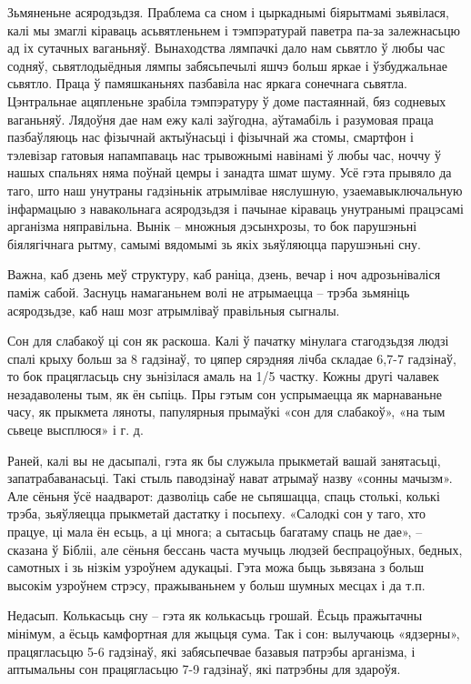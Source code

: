 Зьмяненьне асяродзьдзя. Праблема са сном і цыркаднымі біярытмамі зьявілася, калі мы змаглі кіраваць асьвятленьнем і тэмпэратурай паветра па-за залежнасьцю ад іх сутачных ваганьняў. Вынаходства лямпачкі дало нам сьвятло ў любы час содняў, сьвятлодыёдныя лямпы забясьпечылі яшчэ больш яркае і ўзбуджальнае сьвятло. Праца ў памяшканьнях пазбавіла нас яркага сонечнага сьвятла. Цэнтральнае ацяпленьне зрабіла тэмпэратуру ў доме пастаяннай, бяз содневых ваганьняў. Лядоўня дае нам ежу калі заўгодна, аўтамабіль і разумовая праца пазбаўляюць нас фізычнай актыўнасьці і фізычнай жа стомы, смартфон і тэлевізар гатовыя напампаваць нас трывожнымі навінамі ў любы час, ноччу ў нашых спальнях няма поўнай цемры і занадта шмат шуму. Усё гэта прывяло да таго, што наш унутраны гадзіньнік атрымлівае няслушную, узаемавыключальную інфармацыю з навакольнага асяродзьдзя і пачынае кіраваць унутранымі працэсамі арганізма няправільна. Вынік – множныя дэсынхрозы, то бок парушэньні біялягічнага рытму, самымі вядомымі зь якіх зьяўляюцца парушэньні сну.

Важна, каб дзень меў структуру, каб раніца, дзень, вечар і ноч адрозьніваліся паміж сабой. Заснуць намаганьнем волі не атрымаецца – трэба зьмяніць асяродзьдзе, каб наш мозг атрымліваў правільныя сыгналы.

Сон для слабакоў ці сон як раскоша. Калі ў пачатку мінулага стагодзьдзя людзі спалі крыху больш за 8 гадзінаў, то цяпер сярэдняя лічба складае 6,7-7 гадзінаў, то бок працягласьць сну зьнізілася амаль на 1/5 частку. Кожны другі чалавек незадаволены тым, як ён сьпіць. Пры гэтым сон успрымаецца як марнаваньне часу, як прыкмета ляноты, папулярныя прымаўкі «сон для слабакоў», «на тым сьвеце высплюся» і г. д.

Раней, калі вы не дасыпалі, гэта як бы служыла прыкметай вашай занятасьці, запатрабаванасьці. Такі стыль паводзінаў нават атрымаў назву «сонны мачызм». Але сёньня ўсё наадварот: дазволіць сабе не сьпяшацца, спаць столькі, колькі трэба, зьяўляецца прыкметай дастатку і посьпеху. «Салодкі сон у таго, хто працуе, ці мала ён есьць, а ці многа; а сытасьць багатаму спаць не дае», – сказана ў Бібліі, але сёньня бессань часта мучыць людзей беспрацоўных, бедных, самотных і зь нізкім узроўнем адукацыі. Гэта можа быць зьвязана з больш высокім узроўнем стрэсу, пражываньнем у больш шумных месцах і да т.п.

Недасып. Колькасьць сну – гэта як колькасьць грошай. Ёсьць пражытачны мінімум, а ёсьць камфортная для жыцьця сума. Так і сон: вылучаюць «ядзерны», працягласьцю 5-6 гадзінаў, які забясьпечвае базавыя патрэбы арганізма, і аптымальны сон працягласьцю 7-9 гадзінаў, які патрэбны для здароўя.

